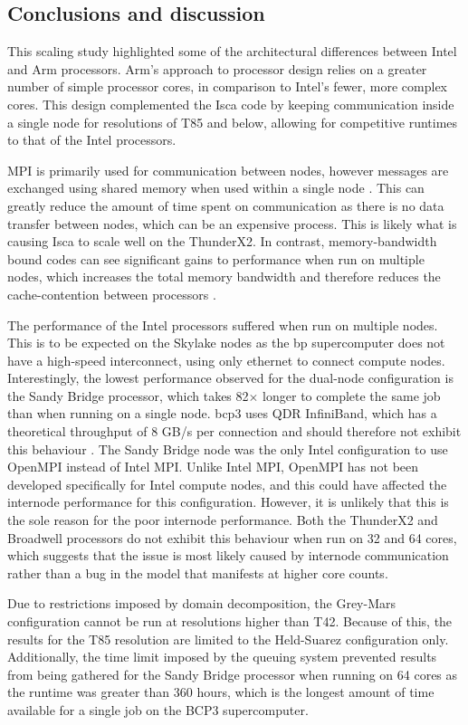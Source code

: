 \documentclass[a4paper,11pt]{report}
\begin{document}
\subsection{Conclusions and discussion}
This scaling study highlighted some of the architectural differences between Intel and Arm processors. Arm's approach to processor design relies on a greater number of simple processor cores, in comparison to Intel's fewer, more complex cores. This design complemented the Isca code by keeping communication inside a single node for resolutions of T85 and below, allowing for competitive runtimes to that of the Intel processors. 
\par
MPI is primarily used for communication between nodes, however messages are exchanged using shared memory when used within a single node \cite{mpi2015standard}. This can greatly reduce the amount of time spent on communication as there is no data transfer between nodes, which can be an expensive process. This is likely what is causing Isca to scale well on the ThunderX2. In contrast, memory-bandwidth bound codes can see significant gains to performance when run on multiple nodes, which increases the total memory bandwidth and therefore reduces the cache-contention between processors \cite{milfeld2014hpc}.
\par
The performance of the Intel processors suffered when run on multiple nodes. This is to be expected on the Skylake nodes as the \gls{bp} supercomputer does not have a high-speed interconnect, using only ethernet to connect compute nodes. Interestingly, the lowest performance observed for the dual-node configuration is the Sandy Bridge processor, which takes 82$\times$ longer to complete the same job than when running on a single node. \gls{bcp3} uses QDR InfiniBand, which has a theoretical throughput of 8 GB/s per connection and should therefore not exhibit this behaviour \cite{grun2010introduction}. The Sandy Bridge node was the only Intel configuration to use OpenMPI instead of Intel MPI. Unlike Intel MPI, OpenMPI has not been developed specifically for Intel compute nodes, and this could have affected the internode performance for this configuration. However, it is unlikely that this is the sole reason for the poor internode performance. Both the ThunderX2 and Broadwell processors do not exhibit this behaviour when run on 32 and 64 cores, which suggests that the issue is most likely caused by internode communication rather than a bug in the model that manifests at higher core counts.
\par
Due to restrictions imposed by domain decomposition, the Grey-Mars configuration cannot be run at resolutions higher than T42. Because of this, the results for the T85 resolution are limited to the Held-Suarez configuration only. Additionally, the time limit imposed by the queuing system prevented results from being gathered for the Sandy Bridge processor when running on 64 cores as the runtime was greater than 360 hours, which is the longest amount of time available for a single job on the BCP3 supercomputer.
\end{document}
